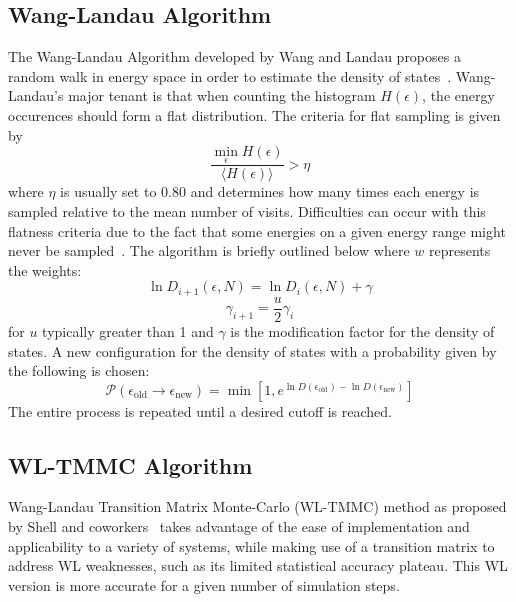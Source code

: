 \documentclass[letterpaper,twocolumn,amsmath,amssymb,pre,aps,10pt]{revtex4-1}
\begin{document}
\subsection{Wang-Landau Algorithm}

The Wang-Landau Algorithm developed by Wang and Landau proposes a
random walk in energy space in order to estimate the density of
states~\cite{wang2001efficient,wang2001determining, landau2014guide}.
Wang-Landau's major tenant is that when counting the histogram
$H(\epsilon)$, the energy occurences should form a flat distribution.
The criteria for flat sampling is given by
\begin{equation}
	\frac{\min_{\epsilon} H(\epsilon)}
	{\big\langle H(\epsilon)\big\rangle }
	> \eta
\end{equation}
where $\eta$ is usually set to $0.80$ and determines how many times
each energy is sampled relative to the mean number of visits.
Difficulties can occur with this flatness criteria due to the fact that
some energies on a given energy range might never be
sampled~\cite{haber2014transition}. The algorithm is briefly outlined
below where $w$ represents the weights:
\begin{equation}
	\ln{D_{i+1}(\epsilon,N)}=\ln{D_{i}(\epsilon,N)}
	+\gamma
\end{equation}
\begin{equation}
	\gamma_{i+1}=\frac{u}{2} \gamma_{i}
\end{equation}
for $u$ typically greater than 1 and $\gamma$ is the modification
factor for the density of states.  A new configuration for the density
of states with a probability given by the following is chosen:
\begin{equation}
	\mathcal{P}(\epsilon_\text{old} \rightarrow \epsilon_\text{new})
	= \min[1,e^{\ln{D(\epsilon_\text{old})}-\ln{D(\epsilon_\text{new})}}]
\end{equation}
The entire process is repeated until a desired cutoff is reached.

\subsection{WL-TMMC Algorithm}

Wang-Landau Transition Matrix Monte-Carlo (WL-TMMC) method as proposed
by Shell and coworkers~\cite{shell2003improved,shell2004flat} takes
advantage of the ease of implementation and applicability to a variety
of systems, while making use of a transition matrix to address WL
weaknesses, such as its limited statistical accuracy plateau.
This WL version is more accurate for a given number of simulation steps.
\end{document}

